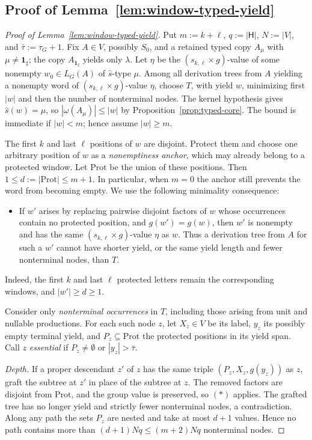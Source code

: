 \documentclass[11pt,a4paper]{article}
\theoremstyle{remark}
\theoremstyle{plain}
\begin{document}
\subsection{Proof of Lemma~\ref{lem:window-typed-yield}}
\begin{proof}[Proof of Lemma~\ref{lem:window-typed-yield}]
Put $m:=k+\ell$, $q:=|\mathsf H|$, $N:=|V|$, and
$\bar\tau:=\tau_G+1$.
Fix $A\in V$, possibly $S_0$, and a retained
typed copy $A_\mu$ with $\mu\ne\mathbf{1}_{\sharp}$;
the copy $A_{\mathbf{1}_{\sharp}}$ yields only $\lambda$.
Let $\eta$ be the $(s_{k,\ell}\times g)$-value of some
nonempty $w_0\in L_G(A)$ of $\widehat s$-type $\mu$.
Among all derivation trees from $A$ yielding a nonempty word
of $(s_{k,\ell}\times g)$-value $\eta$, choose $T$, with
yield $w$, minimizing first $|w|$ and then the number
of nonterminal nodes. The kernel hypothesis gives
$\widehat s(w)=\mu$, so
$|\omega(A_\mu)|\le|w|$ by
Proposition~\ref{prop:typed-core}.
The bound is immediate if $|w|<m$; hence assume
$|w|\ge m$.

The first $k$ and last $\ell$ positions of $w$ are
disjoint. Protect them and choose one arbitrary position
of $w$ as a \emph{nonemptiness anchor}, which may already
belong to a protected window. Let $\mathrm{Prot}$ be the
union of these positions. Then
$1\le d:=|\mathrm{Prot}|\le m+1$.
In particular, when $m=0$ the anchor still prevents
the word from becoming empty. We use the following
minimality consequence:
\begin{itemize}[leftmargin=2.2em]
\item[$(\ast)$]
If $w'$ arises by replacing pairwise disjoint factors of
$w$ whose occurrences contain no protected position,
and $g(w')=g(w)$, then $w'$ is nonempty and has the same
$(s_{k,\ell}\times g)$-value $\eta$ as $w$.
Thus a derivation tree from $A$ for such a $w'$ cannot
have shorter yield, or the same yield length and
fewer nonterminal nodes, than $T$.
\end{itemize}
Indeed, the first $k$ and last $\ell$ protected letters
remain the corresponding windows, and
$|w'|\ge d\ge1$.

Consider only \emph{nonterminal occurrences} in $T$,
including those arising from unit and nullable productions.
For each such node $z$, let $X_z\in V$ be its label,
$y_z$ its possibly empty terminal yield, and
$P_z\subseteq\mathrm{Prot}$ the protected positions
in its yield span. Call $z$ \emph{essential} if
$P_z\ne\emptyset$ or $|y_z|>\bar\tau$.

\emph{Depth.}
If a proper descendant $z'$ of $z$ has the same
triple $(P_z,X_z,g(y_z))$ as $z$, graft the subtree
at $z'$ in place of the subtree at $z$.
The removed factors are disjoint from $\mathrm{Prot}$,
and the group value is preserved, so $(\ast)$ applies.
The grafted tree has no longer yield and strictly
fewer nonterminal nodes, a contradiction.
Along any path the sets $P_z$ are nested and
take at most $d+1$ values. Hence no path contains
more than $(d+1)Nq\le(m+2)Nq$ nonterminal nodes.


\end{proof}
\end{document}
